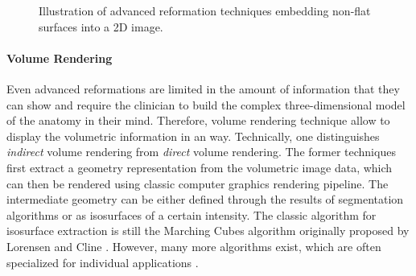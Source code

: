 \begin{figure}[ht]
	\centering
	\qquad
	\caption{Illustration of advanced reformation techniques embedding non-flat surfaces into a 2D image.}
	\label{fig:background:non-linear-reformations}
\end{figure}


\paragraph{Volume Rendering}
Even advanced reformations are limited in the amount of information that they can show and require the clinician to build the complex three-dimensional model of the anatomy in their mind.
Therefore, volume rendering technique allow to display the volumetric information in an  way.
Technically, one distinguishes \emph{indirect} volume rendering from \emph{direct} volume rendering.
The former techniques first extract a geometry representation from the volumetric image data, which can then be rendered using classic computer graphics rendering pipeline.
The intermediate geometry can be either defined through the results of segmentation algorithms or as isosurfaces of a certain intensity.
The classic algorithm for isosurface extraction is still the Marching Cubes algorithm originally proposed by Lorensen and Cline \cite{Lorensen:1987:MarchingCubes}.
However, many more algorithms exist, which are often specialized for individual applications \cite{Livnat:2005:IsosurfaceExtraction}.

